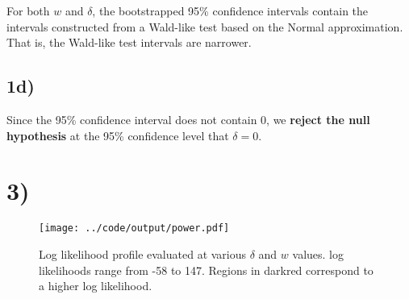 \documentclass[11pt]{article}
\def\beginmyfig{\begin{figure}[H]\center} %
\def\endmyfig{\end{figure}}
\begin{document}
\noindent
For both $w$ and $\delta$, the bootstrapped 95\% confidence intervals contain
the intervals constructed from a Wald-like test based on the Normal
approximation. That is, the Wald-like test intervals are narrower.

\subsection*{1d)}
Since the 95\% confidence interval does not contain 0, we \textbf{reject the
null hypothesis} at the 95\% confidence level that $\delta=0$.


\section*{3)}
\beginmyfig
  \texttt{[image: ../code/output/power.pdf]}
  \caption{\small Log likelihood profile evaluated at various $\delta$ and $w$ values. log likelihoods range from -58 to 147. Regions in darkred correspond to a higher log likelihood.}
  \label{fig:grid}
\endmyfig
\end{document}
